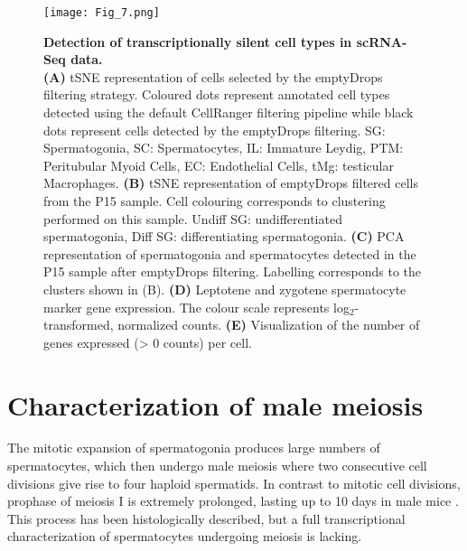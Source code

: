 \begin{figure}[!h]
\centering
\texttt{[image: Fig\_7.png]}
\caption[Transcriptionally silent cell types in spermatogenesis.]{\textbf{Detection of transcriptionally silent cell types in scRNA-Seq data.} \\
\textbf{(A)} tSNE representation of cells selected by the emptyDrops filtering strategy. Coloured dots represent annotated cell types detected using the default CellRanger filtering pipeline while black dots represent cells detected by the emptyDrops filtering. SG: Spermatogonia, SC: Spermatocytes, IL: Immature Leydig, PTM: Peritubular Myoid Cells, EC: Endothelial Cells, tMg: testicular Macrophages. \textbf{(B)} tSNE representation of emptyDrops filtered cells from the P15 sample. Cell colouring corresponds to clustering performed on this sample. Undiff SG: undifferentiated spermatogonia, Diff SG: differentiating spermatogonia. \textbf{(C)} PCA representation of spermatogonia and spermatocytes detected in the P15 sample after emptyDrops filtering. Labelling corresponds to the clusters shown in (B). \textbf{(D)} Leptotene and zygotene spermatocyte marker gene expression. The colour scale represents log$_2$-transformed, normalized counts. \textbf{(E)} Visualization of the number of genes expressed (> 0 counts) per cell.
}
\label{fig3:emptyDrops}
\end{figure}

\newpage


\section{Characterization of male meiosis}

The mitotic expansion of spermatogonia produces large numbers of spermatocytes, which then undergo male meiosis where two consecutive cell divisions give rise to four haploid spermatids. In contrast to mitotic cell divisions, prophase of meiosis I is extremely prolonged, lasting up to 10 days in male mice \citep{Soh2017}. This process has been histologically described, but a full transcriptional characterization of spermatocytes undergoing meiosis is lacking. \\

